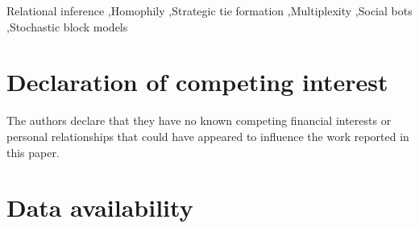 \documentclass[preprint,12pt,authoryear]{elsarticle}
\theoremstyle{definition}
\begin{document}
\begin{frontmatter}
\begin{abstract}
We then measure $\rho$ on MGTAB, a Twitter dataset of $10{,}199$ expert-annotated
accounts in which every account is labelled, so that no tie is lost to unlabelled
alters. Evaluating the exact criterion at each relation's own parameters, \emph{every}
recorded relation turns out to be one on which averaging over alters is worse than
using attributes alone, by factors between $1.3$ and $3.6$. The layers nevertheless
differ sharply in mechanism: on every social relation the automated accounts are almost
perfectly camouflaged---the median one has \emph{no} automated alter, and
automated--automated ties number $212$ against $40{,}263$ automated--genuine ties---
whereas on content-coordination relations (shared URLs, shared hashtags) the same
accounts converge, with automated--automated ties rising to $15{,}963$ and $28{,}203$.
They avoid one another where ties are visible and meet where content is shared, and
$\rho$ differs between the layers by a factor approaching two on identical actors, so
multiplexity rather than aggregate density decides whether relational inference is
usable. We also document why the canonical bot benchmarks cannot support this
measurement at all, and confirm the edge-endpoint identity to machine precision in its
degree-corrected form.

\end{abstract}

\begin{keyword}
Relational inference \sep Homophily \sep Strategic tie formation \sep Multiplexity \sep Social bots \sep Stochastic block models
\end{keyword}

\end{frontmatter}








\section*{Declaration of competing interest}

The authors declare that they have no known competing financial interests or personal
relationships that could have appeared to influence the work reported in this paper.

\section*{Data availability}
\end{document}
